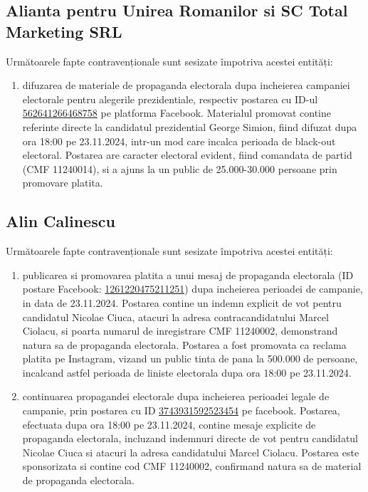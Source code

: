 \documentclass[a4paper,12pt]{article}
\begin{document}
\vspace{0.5cm}

\subsection{Alianta pentru Unirea Romanilor si SC Total Marketing SRL}
Următoarele fapte contravenționale sunt sesizate împotriva acestei entități:

\begin{enumerate}[leftmargin=*, label=\arabic*.)]
    \item difuzarea de materiale de propaganda electorala dupa incheierea campaniei electorale pentru alegerile prezidentiale, respectiv postarea cu ID-ul \href{https://www.facebook.com/ads/library/?id=562641266468758}{562641266468758} pe platforma Facebook. Materialul promovat contine referinte directe la candidatul prezidential George Simion, fiind difuzat dupa ora 18:00 pe 23.11.2024, intr-un mod care incalca perioada de black-out electoral. Postarea are caracter electoral evident, fiind comandata de partid (CMF 11240014), si a ajuns la un public de 25.000-30.000 persoane prin promovare platita.
\end{enumerate}

\vspace{0.5cm}

\subsection{Alin Calinescu}
Următoarele fapte contravenționale sunt sesizate împotriva acestei entități:

\begin{enumerate}[leftmargin=*, label=\arabic*.)]
    \item publicarea si promovarea platita a unui mesaj de propaganda electorala (ID postare Facebook: \href{https://www.facebook.com/ads/library/?id=1261220475211251}{1261220475211251}) dupa incheierea perioadei de campanie, in data de 23.11.2024. Postarea contine un indemn explicit de vot pentru candidatul Nicolae Ciuca, atacuri la adresa contracandidatului Marcel Ciolacu, si poarta numarul de inregistrare CMF 11240002, demonstrand natura sa de propaganda electorala. Postarea a fost promovata ca reclama platita pe Instagram, vizand un public tinta de pana la 500.000 de persoane, incalcand astfel perioada de liniste electorala dupa ora 18:00 pe 23.11.2024.
    \item continuarea propagandei electorale dupa incheierea perioadei legale de campanie, prin postarea cu ID \href{https://www.facebook.com/ads/library/?id=3743931592523454}{3743931592523454} pe facebook. Postarea, efectuata dupa ora 18:00 pe 23.11.2024, contine mesaje explicite de propaganda electorala, incluzand indemnuri directe de vot pentru candidatul Nicolae Ciuca si atacuri la adresa candidatului Marcel Ciolacu. Postarea este sponsorizata si contine cod CMF 11240002, confirmand natura sa de material de propaganda electorala.
\end{enumerate}
\end{document}
